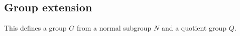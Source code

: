 
\subsection{Group extension}

This defines a group \(G\) from a normal subgroup \(N\) and a quotient group \(Q\).

